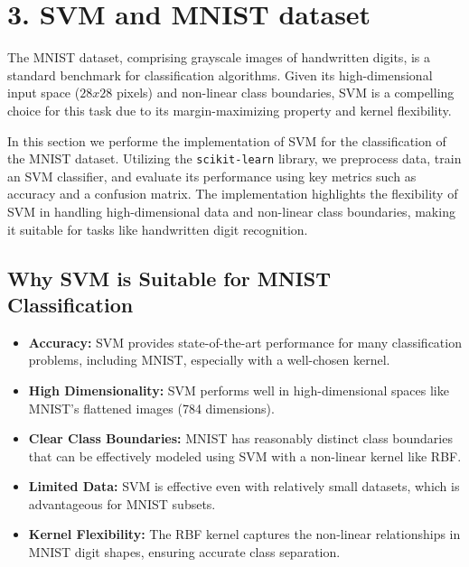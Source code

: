\documentclass{article}
\begin{document}
\section*{3. SVM and MNIST dataset}
The MNIST dataset, comprising grayscale images of handwritten digits, is a standard benchmark for classification algorithms. Given its high-dimensional input space ($28x28$ pixels) and non-linear class boundaries, SVM is a compelling choice for this task due to its margin-maximizing property and kernel flexibility. 

\noindent
In this section we performe the implementation of SVM for the classification of the MNIST dataset. Utilizing the \texttt{scikit-learn} library, we preprocess data, train an SVM classifier, and evaluate its performance using key metrics such as accuracy and a confusion matrix. The implementation highlights the flexibility of SVM in handling high-dimensional data and non-linear class boundaries, making it suitable for tasks like handwritten digit recognition.


\subsection*{Why SVM is Suitable for MNIST Classification}

\begin{itemize}
    \item \textbf{Accuracy:} SVM provides state-of-the-art performance for many classification problems, including MNIST, especially with a well-chosen kernel.
    \item \textbf{High Dimensionality:} SVM performs well in high-dimensional spaces like MNIST's flattened images (784 dimensions).
    \item \textbf{Clear Class Boundaries:} MNIST has reasonably distinct class boundaries that can be effectively modeled using SVM with a non-linear kernel like RBF.
    \item \textbf{Limited Data:} SVM is effective even with relatively small datasets, which is advantageous for MNIST subsets.
    \item \textbf{Kernel Flexibility:} The RBF kernel captures the non-linear relationships in MNIST digit shapes, ensuring accurate class separation.
\end{itemize}


\end{document}
